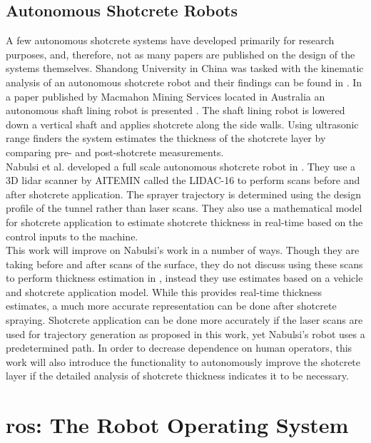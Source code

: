 \subsection{Autonomous Shotcrete Robots}

A few autonomous shotcrete systems have developed primarily for research purposes, and, therefore, not as many papers are published on the design of the systems themselves. Shandong University in China was tasked with the kinematic analysis of an autonomous shotcrete robot and their findings can be found in \cite{kinshot}. In a paper published by Macmahon Mining Services located in Australia an autonomous shaft lining robot is presented \cite{sliner}. The shaft lining robot is lowered down a vertical shaft and applies shotcrete along the side walls. Using ultrasonic range finders the system estimates the thickness of the shotcrete layer by comparing pre- and post-shotcrete measurements.\\

Nabulsi et al. developed a full scale autonomous shotcrete robot in \cite{nabulsi}. They use a 3D \acrshort{lidar} scanner by AITEMIN called the LIDAC-16 to perform scans before and after shotcrete application. The sprayer trajectory is determined using the design profile of the tunnel rather than laser scans. They also use a mathematical model for shotcrete application to estimate shotcrete thickness in real-time based on the control inputs to the machine.\\

This work will improve on Nabulsi's work in a number of ways. Though they are taking before and after scans of the surface, they do not discuss using these scans to perform thickness estimation in \cite{nabulsi}, instead they use estimates based on a vehicle and shotcrete application model. While this provides real-time thickness estimates, a much more accurate representation can be done after shotcrete spraying. Shotcrete application can be done more accurately if the laser scans are used for trajectory generation as proposed in this work, yet Nabulsi's robot uses a predetermined path. In order to decrease dependence on human operators, this work will also introduce the functionality to autonomously improve the shotcrete layer if the detailed analysis of shotcrete thickness indicates it to be necessary.\\


\section{\acrshort{ros}: The Robot Operating System}
\label{sec:ros}

